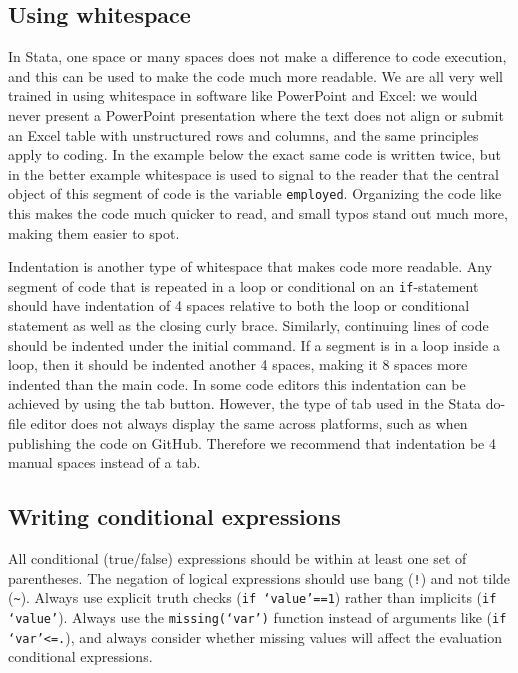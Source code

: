 
\subsection{Using whitespace}

In Stata, one space or many spaces does not make a difference to code execution,
and this can be used to make the code much more readable.
We are all very well trained in using whitespace in software like PowerPoint and Excel:
we would never present a PowerPoint presentation where the text does not align
or submit an Excel table with unstructured rows and columns, and the same principles apply to coding.
In the example below the exact same code is written twice,
but in the better example whitespace is used to signal to the reader
that the central object of this segment of code is the variable \texttt{employed}.
Organizing the code like this makes the code much quicker to read, and small typos
stand out much more, making them easier to spot.


Indentation is another type of whitespace that makes code more readable.
Any segment of code that is repeated in a loop or conditional on an
\texttt{if}-statement should have indentation of 4 spaces relative
to both the loop or conditional statement as well as the closing curly brace.
Similarly, continuing lines of code should be indented under the initial command.
If a segment is in a loop inside a loop, then it should be indented another 4 spaces,
making it 8 spaces more indented than the main code.
In some code editors this indentation can be achieved by using the tab button.
However, the type of tab used in the Stata do-file editor does not always display the same across platforms,
such as when publishing the code on GitHub.
Therefore we recommend that indentation be 4 manual spaces instead of a tab.


\subsection{Writing conditional expressions}

All conditional (true/false) expressions should be within at least one set of parentheses.
The negation of logical expressions should use bang (\texttt{!}) and not tilde (\texttt{\~}).
Always use explicit truth checks (\texttt{if `value'==1}) rather than implicits (\texttt{if `value'}).
Always use the \texttt{missing(`var')} function instead of arguments like (\texttt{if `var'<=.}),
and always consider whether missing values will affect the evaluation conditional expressions.

